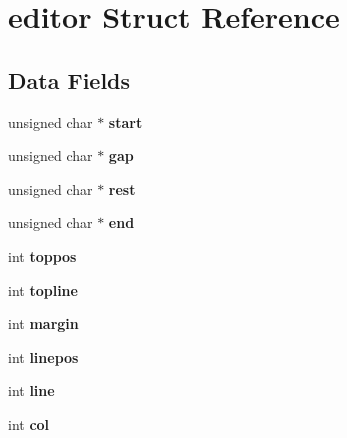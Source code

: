 \hypertarget{structeditor}{}\section{editor Struct Reference}
\label{structeditor}
\subsection*{Data Fields}
\begin{DoxyCompactItemize}
\item 
\mbox{\label{structeditor_a1aca0bc50bb9baa6a802941159e7a48e}} 
unsigned char $\ast$ {\bfseries start}
\item 
\mbox{\label{structeditor_affad8ce14063cff6bd86337aeedae67b}} 
unsigned char $\ast$ {\bfseries gap}
\item 
\mbox{\label{structeditor_a3fafaa1f3f1263f3084a0182e2e76386}} 
unsigned char $\ast$ {\bfseries rest}
\item 
\mbox{\label{structeditor_ab05a853178d6b8a4b2f384b18a8b9028}} 
unsigned char $\ast$ {\bfseries end}
\item 
\mbox{\label{structeditor_aeaea0e0ab112c10217f8dd26a1ea7692}} 
int {\bfseries toppos}
\item 
\mbox{\label{structeditor_ae01ba155465b551ef4fb750d41c586cb}} 
int {\bfseries topline}
\item 
\mbox{\label{structeditor_a7053a4da71b500492624c871ce532387}} 
int {\bfseries margin}
\item 
\mbox{\label{structeditor_a7c19e4b036355e0727498c83051b7c63}} 
int {\bfseries linepos}
\item 
\mbox{\label{structeditor_acbad48540b257e63f1306fb2fa7f3bd5}} 
int {\bfseries line}
\item 
\mbox{\label{structeditor_a52a6b8594b6086cd349bcd2eefefb0ef}} 
int {\bfseries col}
\item 
\mbox{\label{structeditor_adefe27aa0df76a3ecfd6f0f88453fc1c}} 

\end{DoxyCompactItemize}
